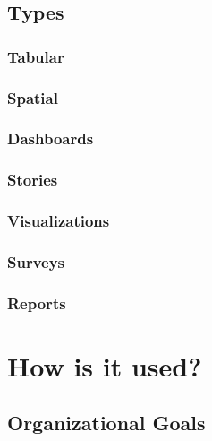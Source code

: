\documentclass[
]{book}
\begin{document}
\hypertarget{types}{%
\subsection{Types}\label{types}}

\hypertarget{tabular}{%
\subsubsection{Tabular}\label{tabular}}

\hypertarget{spatial}{%
\subsubsection{Spatial}\label{spatial}}

\hypertarget{dashboards}{%
\subsubsection{Dashboards}\label{dashboards}}

\hypertarget{stories}{%
\subsubsection{Stories}\label{stories}}

\hypertarget{visualizations}{%
\subsubsection{Visualizations}\label{visualizations}}

\hypertarget{surveys}{%
\subsubsection{Surveys}\label{surveys}}

\hypertarget{reports}{%
\subsubsection{Reports}\label{reports}}

\hypertarget{how-is-it-used}{%
\section{How is it used?}\label{how-is-it-used}}

\hypertarget{organizational-goals}{%
\subsection{Organizational Goals}\label{organizational-goals}}
\end{document}
